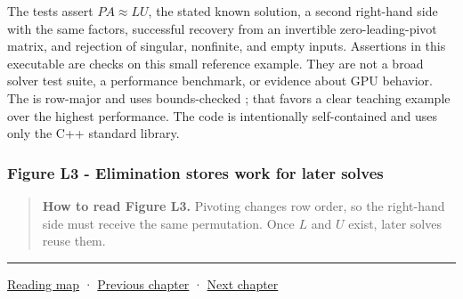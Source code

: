 The tests assert \(PA\approx LU\), the stated known solution, a second right-hand side with the same factors, successful recovery from an invertible zero-leading-pivot matrix, and rejection of singular, nonfinite, and empty inputs. Assertions in this executable are checks on this small reference example. They are not a broad solver test suite, a performance benchmark, or evidence about GPU behavior. The  is row-major and uses bounds-checked ; that favors a clear teaching example over the highest performance. The code is intentionally self-contained and uses only the C++ standard library.

\subsubsection{Figure L3 - Elimination stores work for later solves}\label{01-foundations-i-ch019-figure-l3---elimination-stores-work-for-later-solves}

\hypertarget{01-foundations-i-ch019-figure-l3---elimination-stores-work-for-later-solves}{}


\begin{quote}
\textbf{How to read Figure L3.} Pivoting changes row order, so the right-hand side must receive the same permutation. Once \(L\) and \(U\) exist, later solves reuse them.
\end{quote}

\begin{center}\rule{0.5\linewidth}{0.5pt}\end{center}

\hyperref[volume-reading-map]{Reading map} · \hyperref[01-foundations-i-ch018-vectors-for-light-and-frames]{Previous chapter} · \hyperref[01-foundations-i-ch020-choose-matrix-factorizations-from-structure]{Next chapter}
